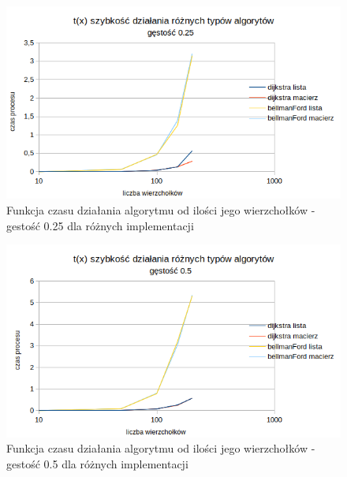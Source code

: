 \documentclass[10pt,a4paper]{article} %
\begin{document}
	\begin{figure}[!ht]
		\centering %
		\includegraphics[scale = 0.9]{dijkstra_bellman_gestosc025.png} %
		\caption{Funkcja czasu działania algorytmu od ilości jego wierzchołków - gestość 0.25 dla różnych implementacji} %
		\label{fig:Obraz4} %
	\end{figure}
	\begin{figure}[!ht]
		\centering %
		\includegraphics[scale = 0.9]{dijkstra_bellman_gestosc05.png} %
		\caption{Funkcja czasu działania algorytmu od ilości jego wierzchołków - gestość 0.5 dla różnych implementacji} %
		\label{fig:Obraz5} %
	\end{figure}

	\clearpage
	
\end{document}

